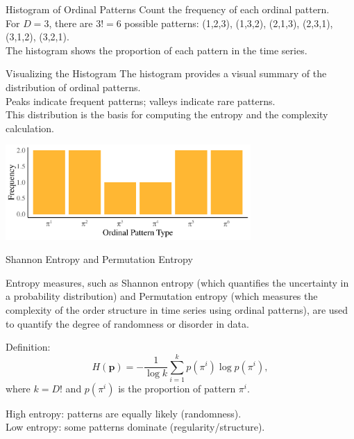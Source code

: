 \documentclass{beamer}
\begin{document}
\begin{frame}{Histogram of Ordinal Patterns}
	Count the frequency of each ordinal pattern.\\
	For $D=3$, there are $3!=6$ possible patterns: (1,2,3), (1,3,2), (2,1,3), (2,3,1), (3,1,2), (3,2,1).\\
	The histogram shows the proportion of each pattern in the time series.
\end{frame}

\begin{frame}{Visualizing the Histogram}
	The histogram provides a visual summary of the distribution of ordinal patterns.\\
	Peaks indicate frequent 
	patterns; valleys indicate rare patterns.\\
	This distribution is the basis for computing the entropy and the complexity 
	calculation.
		\begin{center}
		\includegraphics[width=0.7\textwidth]{frequency histogram}
	\end{center}
\end{frame}


\begin{frame}{Shannon Entropy and Permutation Entropy}


	Entropy measures, such as \alert{Shannon entropy} (which quantifies the uncertainty in a probability distribution) and \alert{Permutation entropy} (which measures the complexity of the order structure in time series using ordinal patterns), are used to quantify the degree of randomness or disorder in data. 
	\begin{block}{Definition:}
		\[
		H(\mathbf{p}) = -\dfrac{1}{\log k} \sum_{i=1}^{k} p(\pi^i) \log p(\pi^i),
		\]
		where $k=D!$ and $p(\pi^i)$ is the proportion of pattern $\pi^i$.
	\end{block}
	High entropy: patterns are equally likely (randomness).\\
	Low entropy: some patterns dominate (regularity/structure).
\end{frame}
\end{document}
